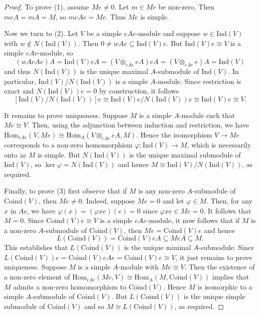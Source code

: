 \documentclass[reqno,11pt]{amsart}
\def\p{\varphi}
\def\to{\rightarrow}
\numberwithin{equation}{section}
\begin{document}
\begin{proof}
To prove (1), assume $Me\neq 0$.  Let $m\in
Me$ be non-zero.  Then $meA = mA=M$, so $meAe=Me$.  Thus $Me$ is
simple.

Now we turn to (2).  Let $V$ be a simple $eAe$-module and suppose
$w\in \mathrm{Ind}(V)$ with $w\notin N(\mathrm{Ind}(V))$.  Then $0\neq wAe\subseteq \mathrm{Ind}(V)e$.
But $\mathrm{Ind}(V)e\cong V$ is a simple $eAe$-module, so \[(wAeAe)A = \mathrm{Ind}(V)eA =
(V\otimes_{eAe}eA)eA = (V\otimes _{eAe}e)A = \mathrm{Ind}(V)\] and thus $N(\mathrm{Ind}(V))$ is
the unique maximal $A$-submodule of $\mathrm{Ind}(V)$.  In particular,
$\mathrm{Ind}(V)/N(\mathrm{Ind}(V))$ is a simple $A$-module.  Since restriction
is exact and $N(\mathrm{Ind}(V))e=0$ by construction, it follows
\[[\mathrm{Ind}(V)/N(\mathrm{Ind}(V))]e\cong \mathrm{Ind}(V)e/N(\mathrm{Ind}(V))e\cong \mathrm{Ind}(V)e\cong V.\]

It remains to prove uniqueness.  Suppose $M$ is a simple
$A$-module such that $Me\cong V$.  Then, using the adjunction between
induction and restriction, we have $\mathrm{Hom}_{eAe}(V,Me)\cong
\mathrm{Hom}_A(V\otimes_{eAe}eA, M)$.  Hence the isomorphism
$V\rightarrow Me$ corresponds to a non-zero homomorphism $\p:\mathrm{Ind}(V)\to M$,
which is necessarily onto as $M$ is simple.  But $N(\mathrm{Ind}(V))$ is the unique
maximal submodule of $\mathrm{Ind}(V)$, so $\ker \p=N(\mathrm{Ind}(V))$ and hence $M\cong
\mathrm{Ind}(V)/N(\mathrm{Ind}(V))$, as required.

Finally, to prove (3) first observe that if $M$ is any non-zero
$A$-submodule of $\mathrm{Coind}(V)$, then $Me\neq 0$.  Indeed,
suppose $Me=0$ and let $\p\in M$. Then, for any $x$ in $Ae$, we have
$\p(x) = (\p xe)(e)=0$ since $\p xe\in Me=0$.  It follows that $M=0$.
Since $\mathrm{Coind}(V)e\cong V$ is a simple $eAe$-module, it now
follows that if $M$ is a non-zero $A$-submodule of
$\mathrm{Coind}(V)$, then $Me=\mathrm{Coind}(V)e$ and hence
\[L(\mathrm{Coind}(V)) = \mathrm{Coind}(V)eA\subseteq MeA\subseteq
M.\]  This establishes that $L(\mathrm{Coind}(V))$ is the unique
minimal $A$-submodule.  Since $L(\mathrm{Coind}(V))e =
\mathrm{Coind}(V)eAe = \mathrm{Coind}(V)e\cong V$, it just remains to
prove uniqueness.  Suppose $M$ is a simple $A$-module with $Me\cong
V$. Then the existence of a non-zero element of
$\mathrm{Hom}_{eAe}(Me,V)\cong \mathrm{Hom}_A(M,\mathrm{Coind}(V))$
implies that $M$ admits a non-zero homomorphism to
$\mathrm{Coind}(V)$.  Hence $M$ is isomorphic to a simple
$A$-submodule of $\mathrm{Coind}(V)$. But $L(\mathrm{Coind}(V))$ is
the unique simple submodule of $\mathrm{Coind}(V)$ and so $M\cong
L(\mathrm{Coind}(V))$, as required. 
\end{proof}
\end{document}
